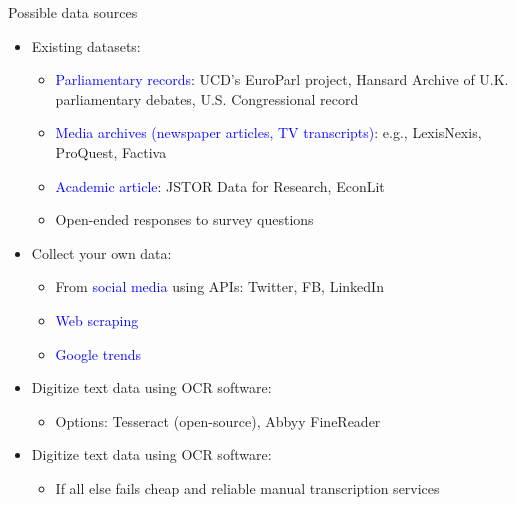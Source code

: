 \documentclass[english]{beamer}
\begin{document}
\begin{frame}{Possible data sources}
\begin{itemize}
\setlength{\itemsep}{0.8em}
\item Existing datasets:
\vspace{2pt}
\begin{itemize}
\setlength{\itemsep}{0.3em}
\item \textcolor{blue}{Parliamentary records}: UCD's EuroParl project, Hansard Archive of U.K. parliamentary debates, U.S. Congressional record
\item \textcolor{blue}{Media archives (newspaper articles, TV transcripts)}: e.g., LexisNexis, ProQuest, Factiva
\item \textcolor{blue}{Academic article}: JSTOR Data for Research, EconLit
\item Open-ended responses to survey questions
\end{itemize}
\pause
\item Collect your own data:
\vspace{2pt}
\begin{itemize}
\setlength{\itemsep}{0.3em}
\item From \textcolor{blue}{social media} using APIs: Twitter, FB, LinkedIn
\item \textcolor{blue}{Web scraping}
\item \textcolor{blue}{Google trends}
\end{itemize} 
\pause
\item Digitize text data using OCR software:
\vspace{2pt}
\begin{itemize}
\setlength{\itemsep}{0.3em}
\item Options: Tesseract (open-source), Abbyy FineReader
\end{itemize} 
\pause
\item Digitize text data using OCR software:
\vspace{2pt}
\begin{itemize}
\setlength{\itemsep}{0.3em}
\pause
\item If all else fails cheap and reliable manual transcription services
\end{itemize} 
\end{itemize}
\end{frame}
\end{document}
